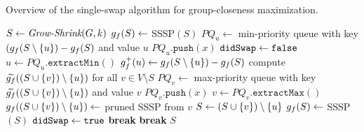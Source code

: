 \begin{algorithm}[t]
\footnotesize
{}
\caption{\footnotesize Overview of the single-swap algorithm for group-closeness maximization.}
\label{algo:gc-ls-apx}
\begin{algorithmic}[1]
\State$S \gets \textit{Grow-Shrink}(G, k)$
\State$g_f(S) \gets$ SSSP$(S)$
\Repeat
\State$PQ_u \gets$ min-priority queue with key $(\gfarn(S \setminus \set{u}) - \gfarn(S)$
and value $u$\label{line:gc-ls-apx:pqu1}
\State$PQ_u.\texttt{push}(x)$
\EndFor\label{line:gc-ls-apx:pqu2}
\State$\texttt{didSwap} \gets \texttt{false}$
\Repeat
\State$u \gets PQ_u.\texttt{extractMin}()$
\State$\gfarn^+(u) \gets \gfarn(S \setminus \set{u}) - \gfarn(S)$\label{line:gc-ls-apx:gfarnplus}
\State compute $\gfarnapx((S \cup \set{v}) \setminus \set{u})$ for all $v \in V \setminus S$
\State$PQ_v \gets$ max-priority queue with key $\gfarnapx((S \cup \set{v}) \setminus \set{u})$
and value $v$\label{line:gc-ls-apx:pqv1}
\State$PQ_v.\texttt{push}(x)$
\EndFor\label{line:gc-ls-apx:pqv2}
\Repeat
\State$v \gets PQ_v.\texttt{extractMax}()$
\State$\gfarn((S \cup \set{v}) \setminus \set{u}) \gets$ pruned SSSP from $v$
\State$S \gets (S \cup \set{v}) \setminus \set{u}$
\State$g_f(S) \gets$ SSSP$(S)$
\State$\texttt{didSwap} \gets \texttt{true}$
\State\textbf{break}
\EndIf
{}
\If{\didswap}
\State\textbf{break}
\EndIf
{}
\State\Return$S$
\end{algorithmic}
\end{algorithm}

